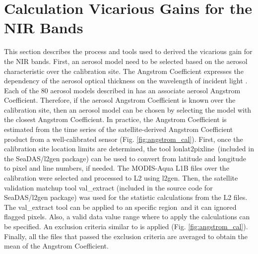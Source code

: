 \documentclass[10pt]{article}
\begin{document}
\section{Calculation Vicarious Gains for the NIR Bands}\label{sec:appendix_a}
This section describes the process and tools used to derived the vicarious gain for the NIR bands. 
First, an aerosol model need to be selected based on the aerosol characteristic over the calibration site. 
The Angstrom Coefficient expresses the dependency of the aerosol optical thickness on the wavelength of incident light \cite{Wang:2005}. 
Each of the 80 aerosol models described in \cite{Ahmad2010} has an associate aerosol Angstrom Coefficient. 
Therefore, if the aerosol Angstrom Coefficient is known over the calibration site, then an aerosol model can be chosen by selecting the model with the closest Angstrom Coefficient. 
In practice, the Angstrom Coefficient is estimated from the time series of the satellite-derived Angstrom Coefficient product from a well-calibrated sensor (Fig. \ref{fig:angstrom_cal}). 
First, once the calibration site location limits are determined, the tool {\ttfamily lonlat2pixline}~(included in the SeaDAS/l2gen package) can be used to convert from latitude and longitude to pixel and line numbers, if needed. 
The MODIS-Aqua L1B files over the calibration were selected and processed to L2 using l2gen. 
Then, the satellite validation matchup tool {\ttfamily val\_extract} (included in the source code for SeaDAS/l2gen package) was used for the statistic calculations from the L2 files. 
The {\ttfamily val\_extract} tool can be applied to an specific region~and it can ignored flagged pixels. 
Also, a valid data value range where to apply the calculations can be specified. 
An exclusion criteria similar to \cite{Werdell:07} is applied (Fig. \ref{fig:angstrom_cal}). Finally, all the files that passed the exclusion criteria are averaged to obtain the mean of the Angstrom Coefficient.

\end{document}
